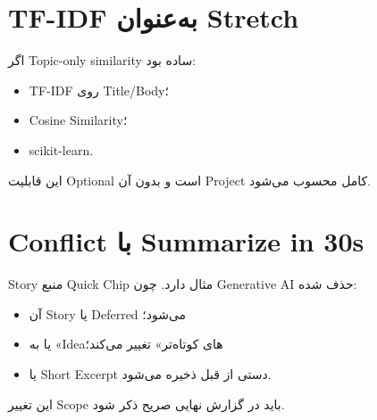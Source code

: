 \section{TF-IDF به‌عنوان Stretch}

اگر Topic-only similarity ساده بود:
\begin{itemize}
  \item TF-IDF روی Title/Body؛
  \item Cosine Similarity؛
  \item scikit-learn.
\end{itemize}

این قابلیت Optional است و بدون آن Project کامل محسوب می‌شود.

\section{Conflict با Summarize in 30s}

Story منبع Quick Chip مثال  دارد. چون Generative AI حذف شده:
\begin{itemize}
  \item آن Story یا Deferred می‌شود؛
  \item یا به «Ideaهای کوتاه‌تر» تغییر می‌کند؛
  \item یا Short Excerpt دستی از قبل ذخیره می‌شود.
\end{itemize}

این تغییر Scope باید در گزارش نهایی صریح ذکر شود.
